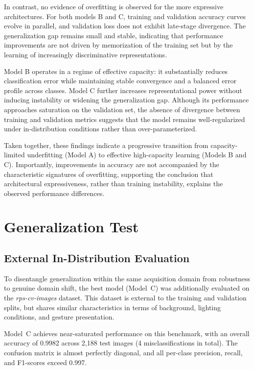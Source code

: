 \documentclass{article}
\begin{document}
In contrast, no evidence of overfitting is observed for the more
expressive architectures. For both models B and C, training and
validation accuracy curves evolve in parallel, and validation loss does
not exhibit late-stage divergence. The generalization gap remains small
and stable, indicating that performance improvements are not driven by
memorization of the training set but by the learning of increasingly
discriminative representations.

Model B operates in a regime of effective capacity: it substantially
reduces classification error while maintaining stable convergence and a
balanced error profile across classes. Model C further increases
representational power without inducing instability or widening the
generalization gap. Although its performance approaches saturation on
the validation set, the absence of divergence between training and
validation metrics suggests that the model remains well-regularized
under in-distribution conditions rather than over-parameterized.

Taken together, these findings indicate a progressive transition from
capacity-limited underfitting (Model A) to effective high-capacity
learning (Models B and C). Importantly, improvements in accuracy are
not accompanied by the characteristic signatures of overfitting,
supporting the conclusion that architectural expressiveness, rather than
training instability, explains the observed performance differences.


\section{Generalization Test}
\subsection{External In-Distribution Evaluation}

To disentangle generalization within the same acquisition domain from 
robustness to genuine domain shift, the best model (Model~C) was 
additionally evaluated on the \emph{rps-cv-images} dataset. This dataset 
is external to the training and validation splits, but shares similar 
characteristics in terms of background, lighting conditions, and gesture 
presentation.

Model~C achieves near-saturated performance on this benchmark, with an 
overall accuracy of 0.9982 across 2,188 test images (4 misclassifications 
in total). The confusion matrix is almost perfectly diagonal, and all 
per-class precision, recall, and F1-scores exceed 0.997. 
\end{document}

